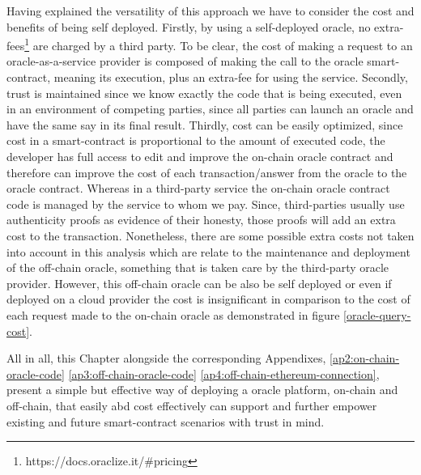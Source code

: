 Having explained the versatility of this approach we have to consider the cost and benefits of being self deployed. Firstly, by using a self-deployed oracle, no extra-fees\footnote{https://docs.oraclize.it/\#pricing} are charged by a third party. To be clear, the cost of making a request to an oracle-as-a-service provider is composed of making the call to the oracle smart-contract, meaning its execution, plus an extra-fee for using the service. Secondly, trust is maintained since we know exactly the code that is being executed, even in an environment of competing parties, since all parties can launch an oracle and have the same say in its final result. Thirdly, cost can be easily optimized, since cost in a smart-contract is proportional to the amount of executed code, the developer has full access to edit and improve the on-chain oracle contract and therefore can improve the cost of each transaction/answer from the oracle to the oracle contract. Whereas in a third-party service the on-chain oracle contract code is managed by the service to whom we pay. Since, third-parties usually use authenticity proofs as evidence of their honesty, those proofs will add an extra cost to the transaction. Nonetheless, there are some possible extra costs not taken into account in this analysis which are relate to the maintenance and deployment of the off-chain oracle, something that is taken care by the third-party oracle provider. However, this off-chain oracle can be also be self deployed or even if deployed on a cloud provider the cost is insignificant in comparison to the cost of each request made to the on-chain oracle as demonstrated in figure \ref{oracle-query-cost}.

All in all, this Chapter alongside the corresponding Appendixes, \ref{ap2:on-chain-oracle-code} \ref{ap3:off-chain-oracle-code} \ref{ap4:off-chain-ethereum-connection}, present a simple but effective way of deploying a oracle platform, on-chain and off-chain, that easily abd cost effectively can support and further empower existing and future smart-contract scenarios with trust in mind.